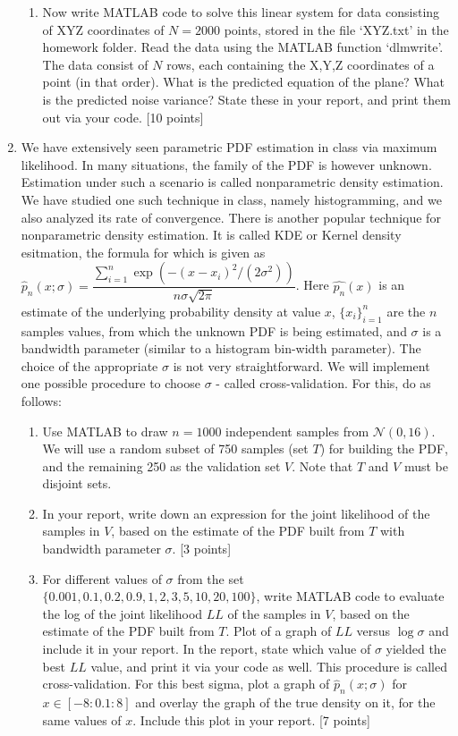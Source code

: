 \documentclass[11pt]{article}
\begin{document}
\begin{enumerate}
\begin{enumerate}
\item Now write MATLAB code to solve this linear system for data consisting of XYZ coordinates of $N = 2000$ points, stored in the file `XYZ.txt' in the homework folder. Read the data using the MATLAB function `dlmwrite'. The data consist of $N$ rows, each containing the X,Y,Z coordinates of a point (in that order). What is the predicted equation of the plane? What is the predicted noise variance? State these in your report, and print them out via your code. \textsf{[10 points]}
\end{enumerate}

\item We have extensively seen parametric PDF estimation in class via maximum likelihood. In many situations, the family of the PDF is however unknown. Estimation under such a scenario is called nonparametric density estimation. We have studied one such technique in class, namely histogramming, and we also analyzed its rate of convergence. There is another popular technique for nonparametric density estimation. It is called KDE or Kernel density esitmation, the formula for which is given as $\hat{p}_n(x;\sigma) = \dfrac{\sum_{i=1}^n \exp{(-(x - x_i)^2/(2 \sigma^2))}}{n \sigma \sqrt{2 \pi}}$. Here $\hat{p_n}(x)$ is an estimate of the underlying probability density at value $x$, $\{x_i\}_{i=1}^n$ are the $n$ samples values, from which the unknown PDF is being estimated, and $\sigma$ is a bandwidth parameter (similar to a histogram bin-width parameter). The choice of the appropriate $\sigma$ is not very straightforward. We will implement one possible procedure to choose $\sigma$ - called cross-validation. For this, do as follows:
\begin{enumerate}
\item Use MATLAB to draw $n = 1000$ independent samples from $\mathcal{N}(0,16)$. We will use a random subset of 750 samples (set $T$) for building the PDF, and the remaining 250 as the validation set $V$. Note that $T$ and $V$ must be disjoint sets. 
\item In your report, write down an expression for the joint likelihood of the samples in $V$, based on the estimate of the PDF built from $T$ with bandwidth parameter $\sigma$. \textsf{[3 points]}
\item For different values of $\sigma$ from the set $\{0.001, 0.1, 0.2, 0.9, 1, 2, 3, 5, 10, 20, 100\}$, write MATLAB code to evaluate the log of the joint likelihood $LL$ of the samples in $V$, based on the estimate of the PDF built from $T$. Plot of a graph of $LL$ versus $\log \sigma$ and include it in your report. In the report, state which value of $\sigma$ yielded the best $LL$ value, and print it via your code as well.  This procedure is called cross-validation. For this best sigma, plot a graph of $\hat{p}_n(x;\sigma)$ for $x \in [-8:0.1:8]$ and overlay the graph of the true density on it, for the same values of $x$. Include this plot in your report. \textsf{[7 points]}

\end{enumerate}
\end{enumerate}
\end{document}
